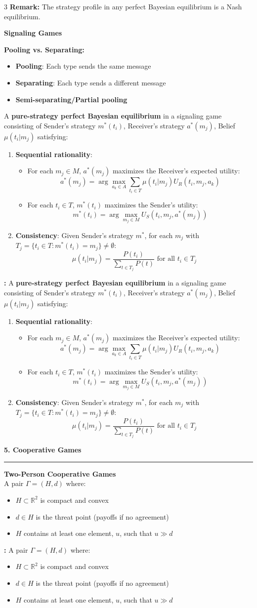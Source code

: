\documentclass[a4paper,landscape,8pt]{article}
\newcommand{\heading}[1]{\noindent\textbf{\textcolor{heading}{\large #1}}\\\rule{\linewidth}{1pt}}
\newcommand{\subheading}[1]{\vspace{1pt}\noindent\textbf{\textcolor{subheading}{#1}}}
\newcommand{\definition}[2][]{\vspace{1pt}\noindent%
  \ifx\relax#1\relax%
    #2%
  \else%
    \textbf{#1 :} #2%
  \fi}
\begin{document}
\begin{multicols}{3}
	\textbf{Remark:} The strategy profile in any perfect Bayesian equilibrium is a Nash equilibrium.

	\subheading{Signaling Games}

	\textbf{Pooling vs. Separating:}
	\begin{itemize}[leftmargin=10pt,itemsep=0pt]
		\item \textbf{Pooling}: Each type sends the same message
		\item \textbf{Separating}: Each type sends a different message
		\item \textbf{Semi-separating/Partial pooling}
	\end{itemize}

	\definition{A \textbf{pure-strategy perfect Bayesian equilibrium} in a signaling game consisting of Sender's strategy $m^*(t_i)$, Receiver's strategy $a^*(m_j)$, Belief $\mu(t_i|m_j)$ satisfying:
		\begin{enumerate}[leftmargin=10pt, itemsep=0pt]
			\item \textbf{Sequential rationality}:
			      \begin{itemize}[leftmargin=10pt,itemsep=0pt]
				      \item For each $m_j \in M$, $a^*(m_j)$ maximizes the Receiver's expected utility:
				            \[a^*(m_j) = \arg\max_{a_k \in A} \sum_{t_i \in T} \mu(t_i|m_j)U_R(t_i, m_j, a_k)\]
				      \item For each $t_i \in T$, $m^*(t_i)$ maximizes the Sender's utility:
				            \[m^*(t_i) = \arg\max_{m_j \in M} U_S(t_i, m_j, a^*(m_j))\]
			      \end{itemize}
			\item \textbf{Consistency}: Given Sender's strategy $m^*$, for each $m_j$ with $T_j = \{t_i \in T : m^*(t_i) = m_j\} \neq \emptyset$:
			      \[\mu(t_i|m_j) = \frac{P(t_i)}{\sum_{t \in T_j}P(t)} \textrm{ for all } t_i \in T_j\]
		\end{enumerate}
	}


	\heading{5. Cooperative Games}

	\subheading{Two-Person Cooperative Games}\\
	\definition{A pair $\Gamma = (H, d)$ where:
		\begin{itemize}[leftmargin=10pt,itemsep=0pt]
			\item $H \subset \mathbb{R}^2$ is compact and convex
			\item $d \in H$ is the threat point (payoffs if no agreement)
			\item $H$ contains at least one element, $u$, such that $u \gg d$
		\end{itemize}}


\end{multicols}
\end{document}
